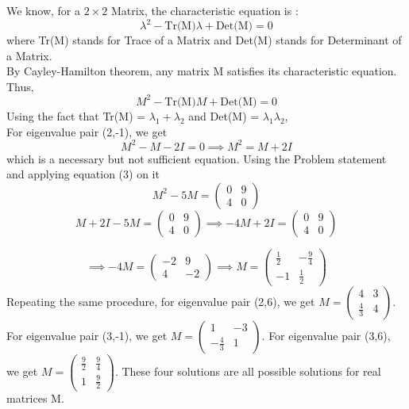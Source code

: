 \documentclass[12pt]{article}
\begin{document}
We know, for a \(2 \times 2\) Matrix, the characteristic equation is : 
\[ \lambda^2 - \text{Tr(M)} \lambda + \text{Det(M)} = 0 \]
where Tr(M) stands for Trace of a Matrix and Det(M) stands for Determinant of a Matrix.\\
By Cayley-Hamilton theorem, any matrix M satisfies its characteristic equation. Thus, 
\[M^2 - \text{Tr(M)} M + \text{Det(M)} = 0 \]
Using the fact that Tr(M) = \( \lambda_1 + \lambda_2\) and Det(M) = \( \lambda_1 \lambda_2\), \\
For eigenvalue pair (2,-1), we get \begin{equation} M^2 - M - 2I = 0 \implies M^2 = M + 2I \end{equation}
which is a necessary but not sufficient equation.  Using the Problem statement and applying equation (3) on it
\[ M^2 - 5M = \begin{pmatrix} 0 & 9 \\ 4 & 0 \end{pmatrix} \]
\[ M + 2I - 5M  = \begin{pmatrix} 0 & 9 \\ 4 & 0 \end{pmatrix}  \implies  -4M + 2I = \begin{pmatrix} 0 & 9 \\ 4 & 0 \end{pmatrix} \]

\[\implies  -4M = \begin{pmatrix} -2 & 9 \\ 4 & -2 \end{pmatrix} \implies M = \begin{pmatrix} \frac{1}{2}
& -\frac{9}{4} \\ -1 & \frac{1}{2} \end{pmatrix} \]
Repeating the same procedure, for eigenvalue pair (2,6), we get \( M = \begin{pmatrix}4 & 3 \\ \frac{4}{3} & 4 \end{pmatrix} \). For eigenvalue pair (3,-1), we get \(M = \begin{pmatrix}1 & -3 \\ -\frac{4}{3} & 1 \end{pmatrix} \). For eigenvalue pair (3,6), we get \( M = \begin{pmatrix}\frac{9}{2} & \frac{9}{4} \\ 1 & \frac{9}{2} \end{pmatrix} \). These four solutions are all possible solutions for real matrices M. 
\end{document}

